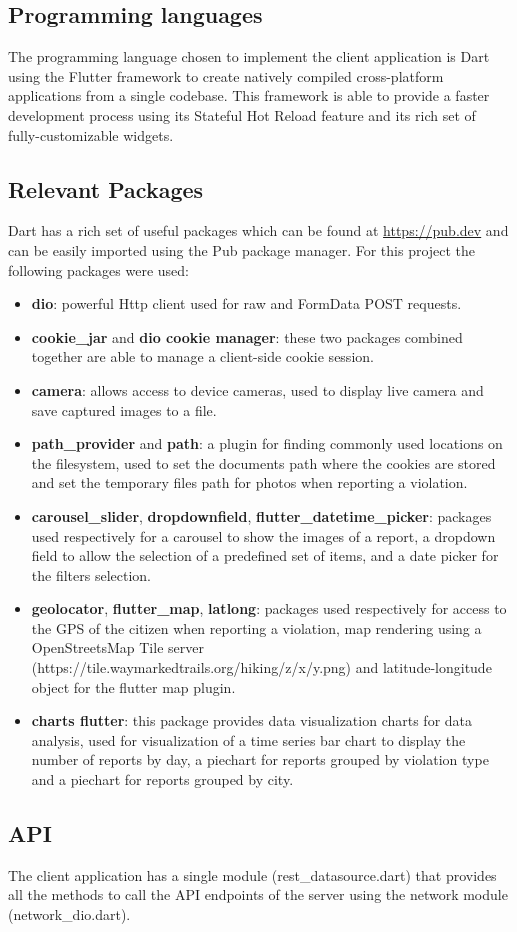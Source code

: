 \subsection{Programming languages}
The programming language chosen to implement the client application is Dart using the Flutter framework to create natively compiled cross-platform applications from a single codebase. This framework is able to provide a faster development process using its Stateful Hot Reload feature and its rich set of fully-customizable widgets.
\subsection{Relevant Packages}
Dart has a rich set of useful packages which can be found at \url{https://pub.dev} and can be easily imported using the Pub package manager. For this project the following packages were used:
	\begin{itemize}
		\item \textbf{dio}: powerful Http client used for raw and FormData POST requests.
		\item \textbf{cookie\_jar} and \textbf{dio cookie manager}: these two packages combined together are able to manage a client-side cookie session.
		\item \textbf{camera}: allows access to device cameras, used to display live camera and save captured images to a file.
		\item \textbf{path\_provider} and \textbf{path}: a plugin for finding commonly used locations on the filesystem, used to set the documents path where the cookies are stored and set the temporary files path for photos when reporting a violation.
		\item \textbf{carousel\_slider}, \textbf{dropdownfield}, \textbf{flutter\_datetime\_picker}: packages used respectively for a carousel to show the images of a report, a dropdown field to allow the selection of a predefined set of items, and a date picker for the filters selection.
		\item \textbf{geolocator}, \textbf{flutter\_map}, \textbf{latlong}: packages used respectively for access to the GPS of the citizen when reporting a violation, map rendering using a OpenStreetsMap Tile server (https://tile.waymarkedtrails.org/hiking/{z}/{x}/{y}.png) and latitude-longitude object for the flutter map plugin.
		\item \textbf{charts flutter}: this package provides data visualization charts for data analysis, used for visualization of a time series bar chart to display the number of reports by day, a piechart for reports grouped by violation type and a piechart for reports grouped by city.
	\end{itemize}
\subsection{API}
The client application has a single module (rest\_datasource.dart) that provides all the methods to call the API endpoints of the server using the network module (network\_dio.dart).